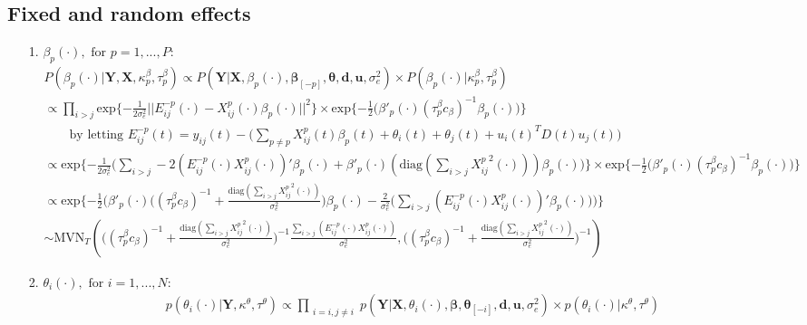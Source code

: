 \documentclass[a4paper]{article}
\begin{document}
\subsection{Fixed and random effects}
\begin{itemize}
	\item [1.]  $\beta_p(\cdot), \mbox{ for } p=1,...,P$:
\begin{equation*}
\begin{aligned}
&P(\beta_p(\cdot)|\boldsymbol{Y}, \boldsymbol{X}, \kappa^\beta_p, \tau^\beta_p) \propto P(\boldsymbol{Y}|\boldsymbol{X}, \beta_p(\cdot), \boldsymbol{\beta}_{[-p]}, \boldsymbol{\theta}, \boldsymbol{d}, \boldsymbol{u},\sigma_e^2) \times P(\beta_p(\cdot)|\kappa^\beta_p, \tau^\beta_p) \\
&\propto\prod\limits_{i>j}\mbox{exp}\{-\frac{1}{2\sigma_e^2}||E^{-p}_{ij}(\cdot)-X^{p}_{ij}(\cdot)\beta_p(\cdot)||^2\}\times \mbox{exp}\{-\frac{1}{2}\Big(\beta'_p(\cdot)(\tau^{\beta}_pc_\beta)^{-1}\beta_p(\cdot)\Big)\}\\
& \quad\quad\mbox{by letting } E^{-p}_{ij}(t)=y_{ij}(t)-\big(\sum_{p\neq p}X^p_{ij}(t)\beta_p(t)+\theta_i(t)+\theta_j(t)+u_i(t)^TD(t)u_j(t)\big)\\
&\propto\mbox{exp}\{-\frac{1}{2\sigma_e^2}\Big(\sum\limits_{i>j}-2(E^{-p}_{ij}(\cdot)X^{p}_{ij}(\cdot))'\beta_p(\cdot)+\beta'_p(\cdot)(\mbox{diag}(\sum\limits_{i>j}{X^p_{ij}}^2(\cdot)))\beta_p(\cdot)\Big)\}\times \mbox{exp}\{-\frac{1}{2}\Big(\beta'_p(\cdot)(\tau^{\beta}_pc_\beta)^{-1}\beta_p(\cdot)\Big)\}\\
&\propto\mbox{exp}\{-\frac{1}{2}\Big(\beta'_p(\cdot)\Big((\tau^{\beta}_pc_\beta)^{-1}+\frac{\mbox{diag}(\sum_{i>j}{X^p_{ij}}^2(\cdot))}{\sigma_e^2}\Big)\beta_p(\cdot)-\frac{2}{\sigma_e^2}\Big(\sum_{i>j}(E^{-p}_{ij}(\cdot)X^{p}_{ij}(\cdot))'\beta_p(\cdot)\Big)\Big)\}\\
& \sim \mbox{MVN}_T(\Big((\tau^{\beta}_pc_\beta)^{-1}+\frac{\mbox{diag}(\sum_{i>j}{X^p_{ij}}^2(\cdot))}{\sigma_e^2}\Big)^{-1}\frac{\sum_{i>j}(E^{-p}_{ij}(\cdot)X^{p}_{ij}(\cdot))}{\sigma_e^2}, \Big((\tau^{\beta}_pc_\beta)^{-1}+\frac{\mbox{diag}(\sum_{i>j}{X^p_{ij}}^2(\cdot))}{\sigma_e^2}\Big)^{-1})
\end{aligned}
\end{equation*} 
		\item [2.] $\theta_{i}(\cdot), \mbox{ for } i=1,...,N$:
		\begin{equation*}
		\begin{aligned}
		&p(\theta_{i}(\cdot)|\boldsymbol{Y}, \kappa^\theta, \tau^\theta) \propto \prod\limits_{\substack{i=i, j\neq i}}p(\boldsymbol{Y}|\boldsymbol{X}, \theta_{i}(\cdot), \boldsymbol{\beta}, \boldsymbol{\theta}_{[-i]}, \boldsymbol{d}, \boldsymbol{u},\sigma_e^2) \times p(\theta_{i}(\cdot)|\kappa^\theta, \tau^\theta) \\

\end{aligned}
\end{equation*}
\end{itemize}
\end{document}
